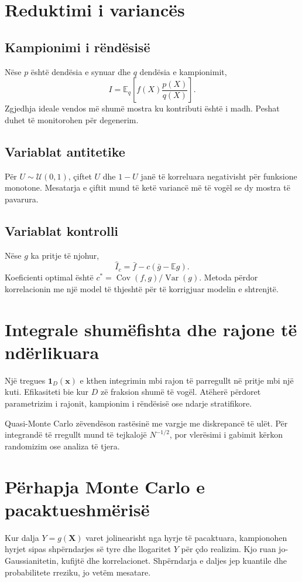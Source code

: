\documentclass[11pt,oneside,openany]{book}
\newcommand{\vect}[1]{\bm{#1}}
\newcommand{\E}{\mathbb{E}}
\newcommand{\Var}{\operatorname{Var}}
\newcommand{\Cov}{\operatorname{Cov}}
\begin{document}
\section{Reduktimi i variancës}
\subsection{Kampionimi i rëndësisë}
Nëse $p$ është dendësia e synuar dhe $q$ dendësia e kampionimit,
\begin{equation}
 I=\E_q\left[f(X)\frac{p(X)}{q(X)}\right].
\end{equation}
Zgjedhja ideale vendos më shumë mostra ku kontributi është i madh. Peshat duhet të monitorohen për degenerim.

\subsection{Variablat antitetike}
Për $U\sim\mathcal U(0,1)$, çiftet $U$ dhe $1-U$ janë të korreluara negativisht për funksione monotone. Mesatarja e çiftit mund të ketë variancë më të vogël se dy mostra të pavarura.

\subsection{Variablat kontrolli}
Nëse $g$ ka pritje të njohur,
\begin{equation}
 \hat I_c=\bar f-c(\bar g-\E g).
\end{equation}
Koeficienti optimal është $c^*=\Cov(f,g)/\Var(g)$. Metoda përdor korrelacionin me një model të thjeshtë për të korrigjuar modelin e shtrenjtë.

\section{Integrale shumëfishta dhe rajone të ndërlikuara}
Një tregues $\mathbf1_D(\vect x)$ e kthen integrimin mbi rajon të parregullt në pritje mbi një kuti. Efikasiteti bie kur $D$ zë fraksion shumë të vogël. Atëherë përdoret parametrizim i rajonit, kampionim i rëndësisë ose ndarje stratifikore.

Quasi-Monte Carlo zëvendëson rastësinë me vargje me diskrepancë të ulët. Për integrandë të rregullt mund të tejkalojë $N^{-1/2}$, por vlerësimi i gabimit kërkon randomizim ose analiza të tjera.

\section{Përhapja Monte Carlo e pacaktueshmërisë}
Kur dalja $Y=g(\vect X)$ varet jolinearisht nga hyrje të pacaktuara, kampionohen hyrjet sipas shpërndarjes së tyre dhe llogaritet $Y$ për çdo realizim. Kjo ruan jo-Gaussianitetin, kufijtë dhe korrelacionet. Shpërndarja e daljes jep kuantile dhe probabilitete rreziku, jo vetëm mesatare.
\end{document}
